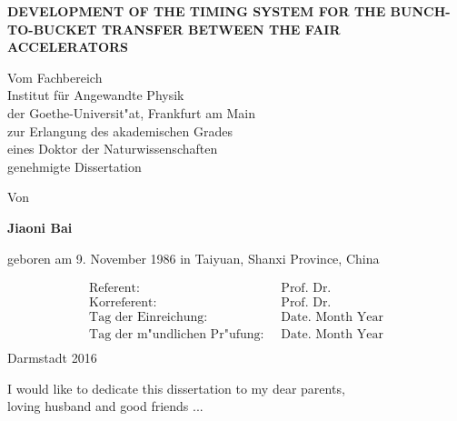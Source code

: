 \documentclass[12pt,twoside]{report}
\begin{document}
\begin{center}
\thispagestyle{empty}

    \vspace{6cm}
	 \LARGE \textbf{\uppercase{Development of the timing system for the Bunch-to-Bucket transfer between the FAIR accelerators }}
	 \vspace{2cm}

	{ \normalsize Vom Fachbereich\\
	Institut für Angewandte Physik\\
	der Goethe-Universit"at, Frankfurt am Main\\
	zur Erlangung des akademischen Grades\\
	eines Doktor der Naturwissenschaften\\
	genehmigte Dissertation\par}
    \vspace{2cm}
    {\normalsize Von \par}
    \LARGE \textbf{ Jiaoni Bai}\\
    {\normalsize geboren am 9. November 1986 in Taiyuan, Shanxi Province, China \par}
    \vspace{2cm}
	\normalsize
	\begin{align*}
		 \text{Referent: }\:  &\text{Prof. Dr. }\\
		 \text{Korreferent: }\: &\text{Prof. Dr.}\\
		 \text{Tag der Einreichung: }\: &\text{Date. Month Year}\\
		 \text{Tag der m"undlichen Pr"ufung: }\: &\text{Date. Month Year} \\
\end{align*}
    \vspace{2cm}
    {\normalsize Darmstadt 2016}
\end{center}

\renewcommand{\labelitemii}{$\bullet$}

\clearpage
\vspace*{\fill}
\begin{center}
\begin{minipage}{.8\textwidth}
I would like to dedicate this dissertation to my dear parents,\\ loving husband and good friends ...
\end{minipage}
\end{center}
\vfill %
\clearpage
\end{document}
